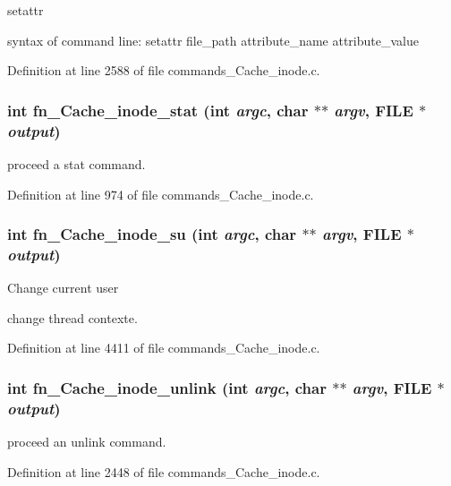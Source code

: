 setattr

syntax of command line: setattr file\_\-path attribute\_\-name attribute\_\-value 

Definition at line 2588 of file commands\_\-Cache\_\-inode.c.
\subsubsection[{fn\_\-Cache\_\-inode\_\-stat}]{\setlength{\rightskip}{0pt plus 5cm}int fn\_\-Cache\_\-inode\_\-stat (int {\em argc}, \/  char $\ast$$\ast$ {\em argv}, \/  FILE $\ast$ {\em output})}\label{commands_8h_4cd5ca6eb69f06e858fc1ff59837dcce}


proceed a stat command. 

Definition at line 974 of file commands\_\-Cache\_\-inode.c.
\subsubsection[{fn\_\-Cache\_\-inode\_\-su}]{\setlength{\rightskip}{0pt plus 5cm}int fn\_\-Cache\_\-inode\_\-su (int {\em argc}, \/  char $\ast$$\ast$ {\em argv}, \/  FILE $\ast$ {\em output})}\label{commands_8h_e03b408b9dc4ff37949b4b761be07a08}


Change current user

change thread contexte. 

Definition at line 4411 of file commands\_\-Cache\_\-inode.c.
\subsubsection[{fn\_\-Cache\_\-inode\_\-unlink}]{\setlength{\rightskip}{0pt plus 5cm}int fn\_\-Cache\_\-inode\_\-unlink (int {\em argc}, \/  char $\ast$$\ast$ {\em argv}, \/  FILE $\ast$ {\em output})}\label{commands_8h_678890f8119b2f025a9ebea4166785a9}


proceed an unlink command. 

Definition at line 2448 of file commands\_\-Cache\_\-inode.c.
